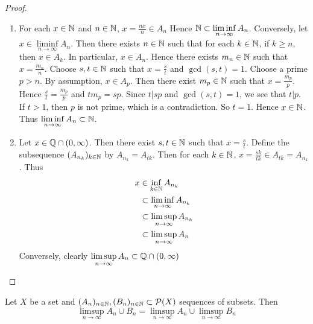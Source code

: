 \documentclass{book}
\begin{document}
	\begin{proof}\
		\begin{enumerate}
			\item For each $x \in \mathbb{N}$ and $n \in \mathbb{N}$, $x = \frac{nx}{n} \in A_n$ Hence $\mathbb{N} \subset \liminf\limits_{n \rightarrow \infty }A_n$. Conversely, let $x \in \liminf\limits_{n \rightarrow \infty }A_n$. Then there exists $n \in \mathbb{N}$ such that for each $k \in \mathbb{N}$, if $k \geq n$, then $x \in A_k$. In particular, $x \in A_n$. Hence there exists $m_n \in \mathbb{N}$ such that $x = \frac{m_n}{n}$. Choose $s,t \in \mathbb{N}$ such that $x= \frac{s}{t}$ and $\gcd(s,t) = 1$. Choose a prime $p > n$. By assumption, $x \in A_p$. Then there exist $m_p \in \mathbb{N}$ such that $x = \frac{m_p}{p}$. Hence $\frac{s}{t} = \frac{m_p}{p}$ and $tm_p = sp$. Since $t | sp$ and $\gcd(s,t) = 1$, we see that $t | p$. If $t > 1$, then $p$ is not prime, which is a contradiction. So $t = 1$. Hence $x \in \mathbb{N}$. Thus $\liminf\limits_{n \rightarrow \infty }A_n \subset \mathbb{N}$. 
			\item Let $x \in \mathbb{Q} \cap (0, \infty)$. Then there exist $s,t \in \mathbb{N}$ such that $x = \frac{s}{t}$. Define the subsequence $(A_{n_k})_{k \in \mathbb{N}}$ by $A_{n_k} = A_{tk}$. Then for each $k \in \mathbb{N}$, $x = \frac{sk}{tk} \in A_{tk} = A_{n_k}$. Thus
			\begin{align*}
				x 
				&\in \inf_{k \in \mathbb{N}} A_{n_k} \\
				& \subset \liminf_{n \rightarrow \infty} A_{n_k} \\
				& \subset \limsup_{n \rightarrow \infty} A_{n_k} \\
				& \subset \limsup\limits_{n \rightarrow \infty } A_n
			\end{align*} 
			Conversely, clearly $\limsup\limits_{n \rightarrow \infty }A_n \subset \mathbb{Q} \cap (0, \infty)$ 
		\end{enumerate}
	\end{proof}
	
	\begin{ex}  
		Let $X$ be a set and $(A_n)_{n \in \mathbb{N}}, (B_n)_{n \in \mathbb{N}} \subset \mathcal{P}(X)$ sequences of subsets. Then $$\limsup\limits_{n \rightarrow \infty} A_n \cup B_n= \limsup\limits_{n \rightarrow \infty} A_n \cup \limsup\limits_{n \rightarrow \infty} B_n$$
	\end{ex}
	
\end{document}
